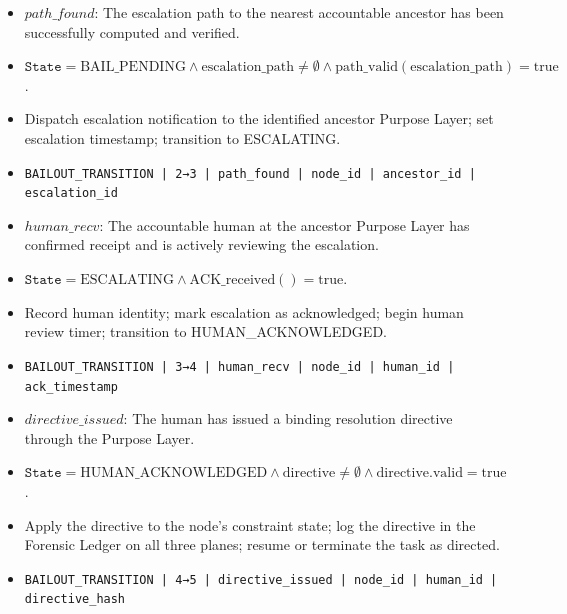 \begin{definition}
\label{def:trans-bail-escalating}
\begin{itemize}[noitemsep]
    \item[\textbf{Event:}] $path\_found$: The escalation path to the nearest accountable ancestor has been successfully computed and verified.
    \item[\textbf{Condition:}] $\texttt{State} = \text{BAIL\_PENDING} \land \text{escalation\_path} \neq \emptyset \land \text{path\_valid}(\text{escalation\_path}) = \text{true}$.
    \item[\textbf{Action:}] Dispatch escalation notification to the identified ancestor Purpose Layer; set escalation timestamp; transition to ESCALATING.
    \item[\textbf{Log entry:}] \texttt{BAILOUT\_TRANSITION | 2→3 | path\_found | node\_id | ancestor\_id | escalation\_id}
\end{itemize}
\end{definition}

\begin{definition}
\label{def:trans-escalating-ack}
\begin{itemize}[noitemsep]
    \item[\textbf{Event:}] $human\_recv$: The accountable human at the ancestor Purpose Layer has confirmed receipt and is actively reviewing the escalation.
    \item[\textbf{Condition:}] $\texttt{State} = \text{ESCALATING} \land \text{ACK\_received}() = \text{true}$.
    \item[\textbf{Action:}] Record human identity; mark escalation as acknowledged; begin human review timer; transition to HUMAN\_ACKNOWLEDGED.
    \item[\textbf{Log entry:}] \texttt{BAILOUT\_TRANSITION | 3→4 | human\_recv | node\_id | human\_id | ack\_timestamp}
\end{itemize}
\end{definition}

\begin{definition}
\label{def:trans-ack-resolved}
\begin{itemize}[noitemsep]
    \item[\textbf{Event:}] $directive\_issued$: The human has issued a binding resolution directive through the Purpose Layer.
    \item[\textbf{Condition:}] $\texttt{State} = \text{HUMAN\_ACKNOWLEDGED} \land \text{directive} \neq \emptyset \land \text{directive.valid} = \text{true}$.
    \item[\textbf{Action:}] Apply the directive to the node's constraint state; log the directive in the Forensic Ledger on all three planes; resume or terminate the task as directed.
    \item[\textbf{Log entry:}] \texttt{BAILOUT\_TRANSITION | 4→5 | directive\_issued | node\_id | human\_id | directive\_hash}
\end{itemize}
\end{definition}

